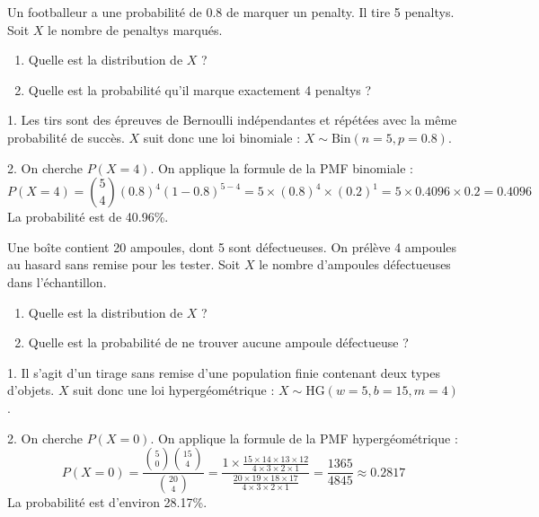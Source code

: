 \begin{exercicebox}
Un footballeur a une probabilité de $0.8$ de marquer un penalty. Il tire 5 penaltys. Soit $X$ le nombre de penaltys marqués.
\begin{enumerate}
    \item Quelle est la distribution de $X$ ?
    \item Quelle est la probabilité qu'il marque exactement 4 penaltys ?
\end{enumerate}
\end{exercicebox}

\begin{correctionbox}
1. Les tirs sont des épreuves de Bernoulli indépendantes et répétées avec la même probabilité de succès. $X$ suit donc une loi binomiale : $X \sim \text{Bin}(n=5, p=0.8)$.

2. On cherche $P(X=4)$. On applique la formule de la PMF binomiale :
$$ P(X=4) = \binom{5}{4} (0.8)^4 (1-0.8)^{5-4} = 5 \times (0.8)^4 \times (0.2)^1 = 5 \times 0.4096 \times 0.2 = 0.4096 $$
La probabilité est de 40.96\%.
\end{correctionbox}

\begin{exercicebox}
Une boîte contient 20 ampoules, dont 5 sont défectueuses. On prélève 4 ampoules au hasard sans remise pour les tester. Soit $X$ le nombre d'ampoules défectueuses dans l'échantillon.
\begin{enumerate}
    \item Quelle est la distribution de $X$ ?
    \item Quelle est la probabilité de ne trouver aucune ampoule défectueuse ?
\end{enumerate}
\end{exercicebox}

\begin{correctionbox}
1. Il s'agit d'un tirage sans remise d'une population finie contenant deux types d'objets. $X$ suit donc une loi hypergéométrique : $X \sim \text{HG}(w=5, b=15, m=4)$.

2. On cherche $P(X=0)$. On applique la formule de la PMF hypergéométrique :
$$ P(X=0) = \frac{\binom{5}{0} \binom{15}{4}}{\binom{20}{4}} = \frac{1 \times \frac{15 \times 14 \times 13 \times 12}{4 \times 3 \times 2 \times 1}}{\frac{20 \times 19 \times 18 \times 17}{4 \times 3 \times 2 \times 1}} = \frac{1365}{4845} \approx 0.2817 $$
La probabilité est d'environ 28.17\%.
\end{correctionbox}

